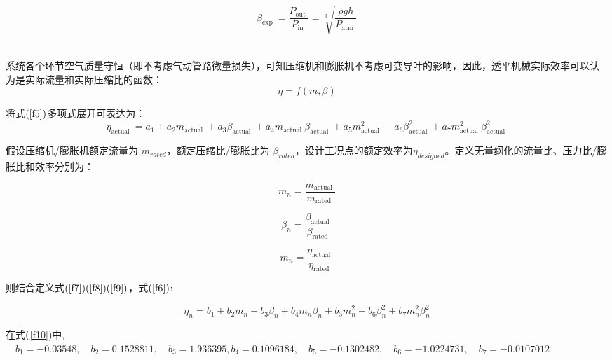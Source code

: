 \documentclass{jnuthesis}
\begin{document}
	\begin{equation}
		\beta_{\text {exp }}=\frac{P_{\text {out }}}{P_{\text {in }}}=\sqrt[3]{\frac{\rho g h }{P_{\text {atm }} }}
	\end{equation}\ 
	
	系统各个环节空气质量守恒（即不考虑气动管路微量损失），可知压缩机和膨胀机不考虑可变导叶的影响，因此，透平机械实际效率可以认为是实际流量和实际压缩比的函数：
	\begin{equation}
		\eta=f(m, \beta)
		\label{f5}
	\end{equation}
	
	将式$ (\fontsize{10.5bp}{10pt}\ref{f5}) $多项式展开可表达为：
	\begin{equation}\label{f6}
		\eta_{\text {actual }}=a_{1}+a_{2} m_{\text {actual }}+a_{3} \beta_{\text {actual }}+a_{4} m_{\text {actual }} \beta_{\text {actual }}+a_{5} m_{\text {actual }}^{2}+a_{6} \beta_{\text {actual }}^{2}+a_{7} m_{\text {actual }}^{2} \beta_{\text {actual }}^{2}
	\end{equation}
	
	
	假设压缩机/膨胀机额定流量为 $ m_{rated}$，额定压缩比/膨胀比为 $ \beta_{rated}$，设计工况点的额定效率为$\eta_{designed}$。定义无量纲化的流量比、压力比/膨胀比和效率分别为：
	
	\begin{equation}\label{f7}
		m_{n}=\frac{m_{\text {actual }}}{m_{\text {rated }}}
	\end{equation}
	
	\begin{equation}\label{f8}
		\beta_{n}=\frac{\beta_{\text {actual }}}{\beta_{\text {rated }}}
	\end{equation}
	
	\begin{equation}\label{f9}
		m_{n}=\frac{\eta_{\text {actual }}}{\eta_{\text {rated }}}
	\end{equation}
	
	则结合定义式$  (\fontsize{10.5bp}{10pt}\ref{f7}) (\fontsize{10.5bp}{10pt}\ref{f8}) (\fontsize{10.5bp}{10pt}\ref{f9})  $，式$ (\fontsize{10.5bp}{10pt}\ref{f6}) $:
	
	\begin{equation}\label{f10}
		\eta_{n}=b_{1}+b_{2} m_{n}+b_{3} \beta_{n}+b_{4} m_{n} \beta_{n}+b_{5} m_{n}^{2}+b_{6} \beta_{n}^{2}+b_{7} m_{n}^{2} \beta_{n}^{2}
	\end{equation}
	
	在式$ (\fontsize{10.5bp}{10pt} $\ref{f10})中,$  \quad b_{1}=-0.03548, \quad b_{2}=0.1528811, \quad b_{3}=1.936395,b_{4}=0.1096184, \quad b_{5}=-0.1302482, \quad b_{6}=-1.0224731, \quad b_{7}=-0.0107012 $ \cite{b3}
	
\end{document}
